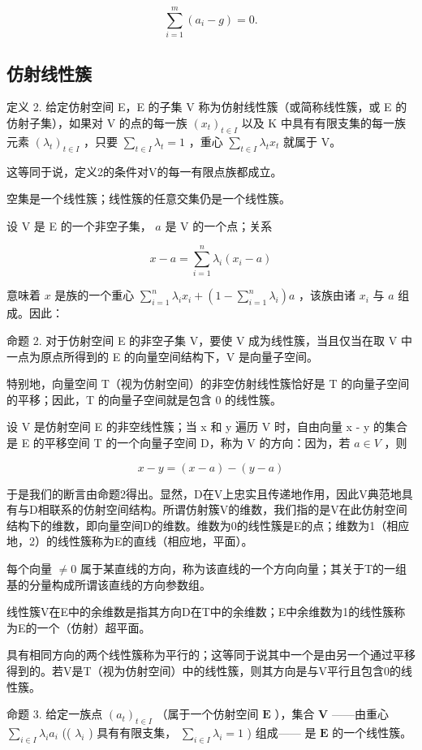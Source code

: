 \[
\sum_ {i = 1} ^ {m} \left(a _ {i} - g\right) = 0.
\]

\subsection{仿射线性簇}

定义 2. 给定仿射空间 E，E 的子集 V 称为仿射线性簇（或简称线性簇，或 E 的仿射子集），如果对 V 的点的每一族 \((x_{t})_{t\in I}\) 以及 K 中具有有限支集的每一族元素 \((\lambda_t)_{t\in I}\) ，只要 \(\sum_{t\in I}\lambda_t = 1\) ，重心 \(\sum_{t\in I}\lambda_t x_t\) 就属于 V。

这等同于说，定义2的条件对V的每一有限点族都成立。

空集是一个线性簇；线性簇的任意交集仍是一个线性簇。

设 V 是 E 的一个非空子集， \(a\) 是 V 的一个点；关系

\[
x - a = \sum_ {i = 1} ^ {n} \lambda_ {i} (x _ {i} - a)
\]

意味着 \(x\) 是族的一个重心 \(\sum_{i=1}^{n} \lambda_i x_i + \left(1 - \sum_{i=1}^{n} \lambda_i\right)a\) ，该族由诸 \(x_i\) 与 \(a\) 组成。因此：

命题 2. 对于仿射空间 E 的非空子集 V，要使 V 成为线性簇，当且仅当在取 V 中一点为原点所得到的 E 的向量空间结构下，V 是向量子空间。

特别地，向量空间 T（视为仿射空间）的非空仿射线性簇恰好是 T 的向量子空间的平移；因此，T 的向量子空间就是包含 0 的线性簇。

设 V 是仿射空间 E 的非空线性簇；当 x 和 y 遍历 V 时，自由向量 x - y 的集合是 E 的平移空间 T 的一个向量子空间 D，称为 V 的方向：因为，若 \(a \in V\) ，则

\[
x - y = (x - a) - (y - a)
\]

于是我们的断言由命题2得出。显然，D在V上忠实且传递地作用，因此V典范地具有与D相联系的仿射空间结构。所谓仿射簇V的维数，我们指的是V在此仿射空间结构下的维数，即向量空间D的维数。维数为0的线性簇是E的点；维数为1（相应地，2）的线性簇称为E的直线（相应地，平面）。

每个向量 \(\neq0\) 属于某直线的方向，称为该直线的一个方向向量；其关于T的一组基的分量构成所谓该直线的方向参数组。

线性簇V在E中的余维数是指其方向D在T中的余维数；E中余维数为1的线性簇称为E的一个（仿射）超平面。

具有相同方向的两个线性簇称为平行的；这等同于说其中一个是由另一个通过平移得到的。若V是T（视为仿射空间）中的线性簇，则其方向是与V平行且包含0的线性簇。

命题 3. 给定一族点 \((a_{t})_{t\in I}\) （属于一个仿射空间 \(\mathbf{E}\) ），集合 \(\mathbf{V}\) ——由重心 \(\sum_{i\in I}\lambda_i a_i\) (( \(\lambda_i\) ) 具有有限支集， \(\sum_{i\in I}\lambda_i = 1\) ) 组成—— 是 \(\mathbf{E}\) 的一个线性簇。

